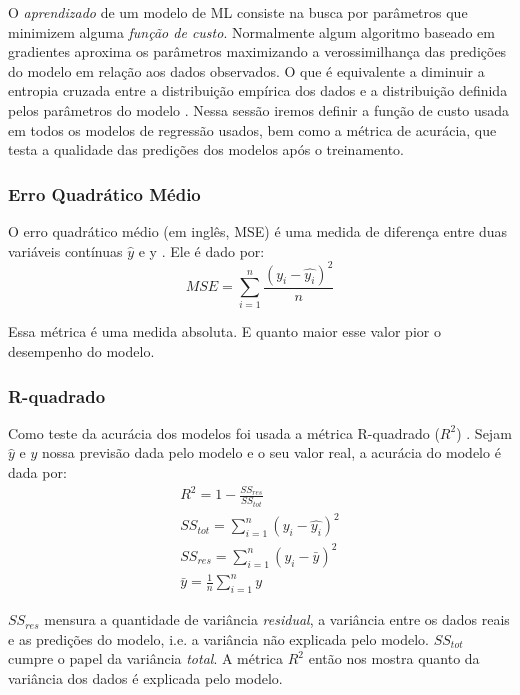 O \textit{aprendizado} de um modelo de ML consiste na busca por parâmetros que
minimizem alguma \textit{função de custo}. Normalmente algum algoritmo baseado
em gradientes aproxima os parâmetros maximizando a verossimilhança das predições
do modelo em relação aos dados observados. O que é equivalente a diminuir a
entropia cruzada entre a distribuição empírica dos dados e a distribuição
definida pelos parâmetros do modelo \citep{dlbook}. Nessa sessão iremos definir
a função de custo usada em todos os modelos de regressão usados, bem como a
métrica de acurácia, que testa a qualidade das predições dos modelos após o treinamento. \\

\subsubsection{Erro Quadrático Médio}
\label{sec:MSE}
O erro quadrático médio (em inglês, MSE) é uma medida de diferença entre duas variáveis contínuas
$\hat{y}$ e y \citep{cohen}. Ele é dado por: \\

\[MSE = \sum^n_{i=1}\frac{(y_i - \hat{y_i})^2}{n}\]

Essa métrica é uma medida absoluta. E quanto maior esse valor pior o desempenho
do modelo. \\

\subsubsection{R-quadrado}
Como teste da acurácia dos modelos foi usada a métrica R-quadrado ($R^2$) \citep{cohen}. Sejam $\hat{y}$ e $y$ nossa previsão dada pelo modelo e o seu valor real, a acurácia do modelo é dada por:\\

\begin{align}
&R^2 = 1 - \frac{SS_{res}}{SS_{tot}} &\\
&SS_{tot} = \sum^n_{i=1} (y_i- \hat{y_i})^2 &\\
&SS_{res} = \sum^n_{i=1} (y_i - \bar{y})^2 &\\
&\bar{y} = \frac{1}{n} \sum^n_{i=1} y &
\end{align}

$SS_{res}$ mensura a quantidade de variância \textit{residual}, a
variância entre os dados reais e as predições do modelo, i.e. a variância não
explicada pelo modelo. $SS_{tot}$ cumpre o papel da variância \textit{total}. A métrica $R^2$
então nos mostra quanto da variância dos dados é explicada pelo modelo. \\


